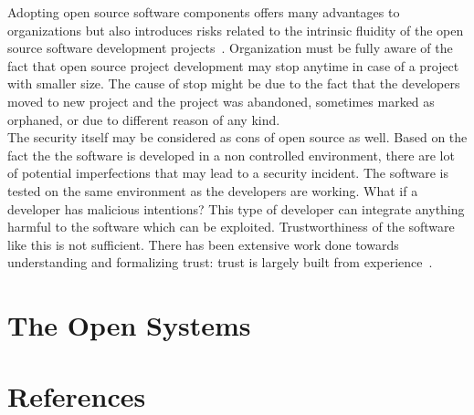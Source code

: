 \documentclass[12pt,a4paper]{article}
\theoremstyle{definition}
\begin{document}
        Adopting open source software components offers many advantages to organizations but also introduces risks related to the intrinsic fluidity of the open source software development projects~\cite{7883433}. Organization must be fully aware of the fact that open source project development may stop anytime in case of a project with smaller size. The cause of stop might be due to the fact that the developers moved to new project and the project was abandoned, sometimes marked as orphaned, or due to different reason of any kind.\\

        The security itself may be considered as cons of open source as well. Based on the fact the the software is developed in a non controlled environment, there are lot of potential imperfections that may lead to a security incident. The software is tested on the same environment as the developers are working. What if a developer has malicious intentions? This type of developer can integrate anything harmful to the software which can be exploited. Trustworthiness of the software like this is not sufficient. There has been extensive work done towards understanding and formalizing trust: trust is largely built from experience~\cite{6340126}.

\section{The Open Systems}

\newpage

\section{References}

\begin{flushleft}
    
\end{flushleft}
\end{document}
